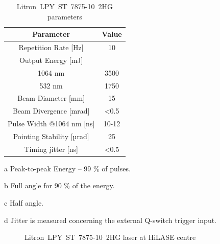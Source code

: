 \begin{table}[h!] 
\centering
        \caption[Litron~LPY~ST~7875-10~2HG parameters]{Litron~LPY~ST~7875-10~2HG parameters \protect\cite{litronmanual}}
    \begin{threeparttable}
        \begin{tabular}{|c | c|} 
        \hline
            \textbf{Parameter} & \textbf{Value} \\ [0.5ex] 
        \hline
        Repetition Rate [Hz] & 10  \\ 
        \hline
            Output Energy [mJ] & \\
            1064 nm & 3500 \tnote{a} \\
            532 nm & 1750 \\
        \hline
            Beam Diameter [mm] & 15  \\
        \hline
            Beam Divergence [mrad] & \textless 0.5 \tnote{b} \\ 
        \hline
            Pulse Width @1064 nm [ns] & 10-12 \\
        \hline
            Pointing Stability [µrad] & 25 \tnote{c} \\
        \hline
            Timing jitter [ns] & \textless 0.5 \tnote{d}  \\
        \hline
        \end{tabular}
        \begin{tablenotes}
            \small
            \item[a] Peak-to-peak Energy -- 99 \% of pulses. 
            \item[b] Full angle for 90 \% of the energy.
            \item[c] Half angle.
            \item[d] Jitter is measured concerning the external Q-switch trigger input.
        \end{tablenotes}
        
    \end{threeparttable}

\label{tab:litronparameters}
\end{table}

\begin{figure}[h]
    \centering
    \noindent{}
    \caption{Litron~LPY~ST~7875-10~2HG laser at HiLASE centre}
    \label{fig:litron}
\end{figure}





